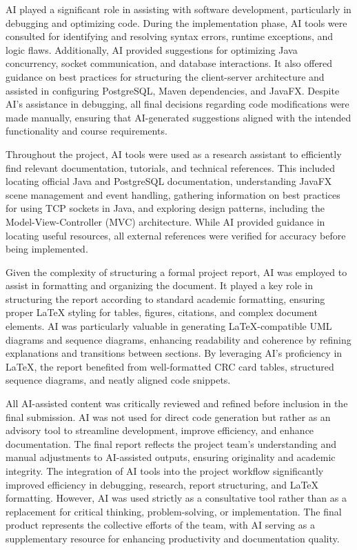 \documentclass[12pt,a4paper]{report}
\begin{document}
AI played a significant role in assisting with software development,
particularly in debugging and optimizing code. During the implementation phase,
AI tools were consulted for identifying and resolving syntax errors, runtime
exceptions, and logic flaws. Additionally, AI provided suggestions for
optimizing Java concurrency, socket communication, and database interactions.
It also offered guidance on best practices for structuring the client-server
architecture and assisted in configuring PostgreSQL, Maven dependencies, and
JavaFX. Despite AI's assistance in debugging, all final decisions regarding
code modifications were made manually, ensuring that AI-generated suggestions
aligned with the intended functionality and course requirements.

Throughout the project, AI tools were used as a research assistant to
efficiently find relevant documentation, tutorials, and technical references.
This included locating official Java and PostgreSQL documentation,
understanding JavaFX scene management and event handling, gathering information
on best practices for using TCP sockets in Java, and exploring design patterns,
including the Model-View-Controller (MVC) architecture. While AI provided
guidance in locating useful resources, all external references were verified
for accuracy before being implemented.

Given the complexity of structuring a formal project report, AI was employed to
assist in formatting and organizing the document. It played a key role in
structuring the report according to standard academic formatting, ensuring
proper LaTeX styling for tables, figures, citations, and complex document
elements. AI was particularly valuable in generating LaTeX-compatible UML
diagrams and sequence diagrams, enhancing readability and coherence by refining
explanations and transitions between sections. By leveraging AI's proficiency
in LaTeX, the report benefited from well-formatted CRC card tables, structured
sequence diagrams, and neatly aligned code snippets.

All AI-assisted content was critically reviewed and refined before inclusion in
the final submission. AI was not used for direct code generation but rather as
an advisory tool to streamline development, improve efficiency, and enhance
documentation. The final report reflects the project team's understanding and
manual adjustments to AI-assisted outputs, ensuring originality and academic
integrity. The integration of AI tools into the project workflow significantly
improved efficiency in debugging, research, report structuring, and LaTeX
formatting. However, AI was used strictly as a consultative tool rather than as
a replacement for critical thinking, problem-solving, or implementation. The
final product represents the collective efforts of the team, with AI serving as
a supplementary resource for enhancing productivity and documentation quality.
\end{document}
